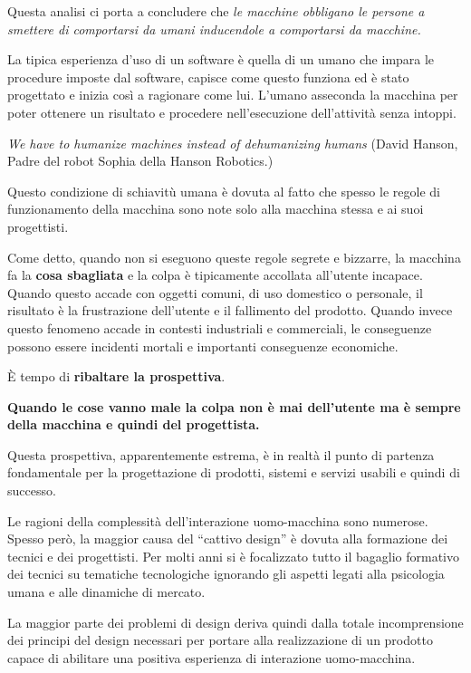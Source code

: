 Questa analisi ci porta a concludere che \textit{le macchine obbligano le persone a smettere di comportarsi da umani inducendole a comportarsi da macchine.}

La tipica esperienza d'uso di un software è quella di un umano che impara le procedure imposte dal software, capisce come questo funziona ed è stato progettato e inizia così a ragionare come lui. L'umano asseconda la macchina per poter ottenere un risultato e procedere nell'esecuzione dell'attività senza intoppi.

\begin{flushleft}
	\textit{We have to humanize machines instead of dehumanizing humans} (David Hanson, Padre del robot Sophia della Hanson Robotics.)
\end{flushleft}

Questo condizione di schiavitù umana è dovuta al fatto che spesso le regole di funzionamento della macchina sono note solo alla macchina stessa e ai suoi progettisti. 

Come detto, quando non si eseguono queste regole segrete e bizzarre, la macchina fa la \textbf{cosa sbagliata} e la colpa è tipicamente accollata all'utente incapace. Quando questo accade con oggetti comuni, di uso domestico o personale, il risultato è la frustrazione dell'utente e il fallimento del prodotto. Quando invece questo fenomeno accade in contesti industriali e commerciali, le conseguenze possono essere incidenti mortali e importanti conseguenze economiche.

È tempo di \textbf{ribaltare la prospettiva}. 

\begin{flushleft}
	\textbf{Quando le cose vanno male la colpa non è mai dell'utente ma è sempre della macchina e quindi del progettista.}
\end{flushleft}

Questa prospettiva, apparentemente estrema, è in realtà il punto di partenza fondamentale per la progettazione di prodotti, sistemi e servizi usabili e quindi di successo. 

Le ragioni della complessità dell'interazione uomo-macchina sono numerose. Spesso però, la maggior causa del ``cattivo design'' è dovuta alla formazione dei tecnici e dei progettisti. Per molti anni si è focalizzato tutto il bagaglio formativo dei tecnici su tematiche tecnologiche ignorando gli aspetti legati alla psicologia umana e alle dinamiche di mercato.

La maggior parte dei problemi di design deriva quindi dalla totale incomprensione dei principi del design necessari per portare alla realizzazione di un prodotto capace di abilitare una positiva esperienza di interazione uomo-macchina.

